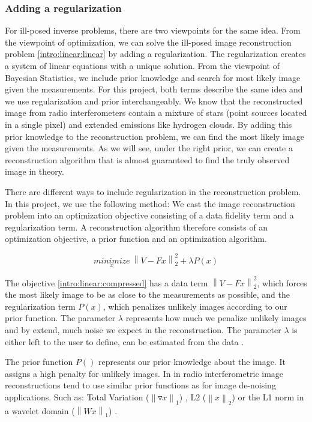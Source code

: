 \subsubsection{Adding a regularization} \label{intro:linear:regularization}
For ill-posed inverse problems, there are two viewpoints for the same idea. From the viewpoint of optimization, we can solve the ill-posed image reconstruction problem \eqref{intro:linear:linear} by adding a regularization. The regularization creates a system of linear equations with a unique solution. From the viewpoint of Bayesian Statistics, we include prior knowledge and search for most likely image given the measurements. For this project, both terms describe the same idea and we use regularization and prior interchangeably. We know that the reconstructed image from radio interferometers contain a mixture of stars (point sources located in a single pixel) and extended emissions like hydrogen clouds. By adding this prior knowledge to the reconstruction problem, we can find the most likely image given the measurements. As we will see, under the right prior, we can create a reconstruction algorithm that is almost guaranteed to find the truly observed image in theory.

There are different ways to include regularization in the reconstruction problem. In this project, we use the following method: We cast the image reconstruction problem into an optimization objective consisting of a data fidelity term and a regularization term. A reconstruction algorithm therefore consists of an optimization objective, a prior function and an optimization algorithm.

\begin{equation}\label{intro:linear:compressed}
\underset{x}{minimize} \: \left \| V - Fx \right \|_2^2 + \lambda P(x)
\end{equation}

The objective \eqref{intro:linear:compressed} has a data term $\left \| V - Fx \right \|_2^2$, which forces the most likely image to be as close to the measurements as possible, and the regularization term $P(x)$, which penalizes unlikely images according to our prior function. The parameter $\lambda$ represents how much we penalize unlikely images and by extend, much noise we expect in the reconstruction. The parameter $\lambda$ is either left to the user to define, can be estimated from the data \cite{miller1970least}. 

The prior function $P()$ represents our prior knowledge about the image. It assigns a high penalty for unlikely images. In in radio interferometric image reconstructions tend to use similar prior functions as for image de-noising applications. Such as: Total Variation ($\left \| \triangledown x \right \|_1$) \cite{wiaux2009compressed}, L2 ($\left \|x \right \|_2$) \cite{ferrari2014distributed} or the L1 norm in a wavelet domain ($\left \|Wx \right \|_1$) \cite{girard2015sparse}.

